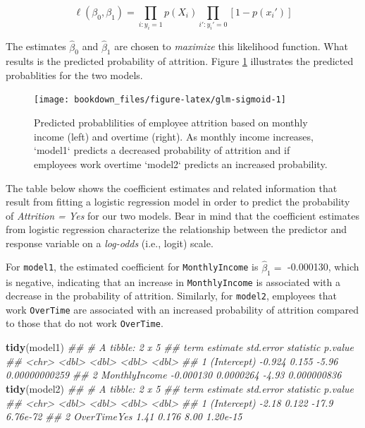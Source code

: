 \documentclass[]{krantz}
\makeatletter
\newenvironment{Shaded}{\begin{snugshade}}{\end{snugshade}}
\newcommand{\CommentTok}[1]{\textcolor[rgb]{0.37,0.37,0.37}{\textit{#1}}}
\newcommand{\KeywordTok}[1]{\textcolor[rgb]{0.27,0.27,0.27}{\textbf{#1}}}
\newcommand{\NormalTok}[1]{#1}
\newenvironment{kframe}{%
\medskip{}
\setlength{\fboxsep}{.8em}
 \def\at@end@of@kframe{}%
 \ifinner\ifhmode%
  \def\at@end@of@kframe{\end{minipage}}%
  \begin{minipage}{\columnwidth}%
 \fi\fi%
 \def\FrameCommand##1{\hskip\@totalleftmargin \hskip-\fboxsep
 \colorbox{shadecolor}{##1}\hskip-\fboxsep
     \hskip-\linewidth \hskip-\@totalleftmargin \hskip\columnwidth}%
 \MakeFramed {\advance\hsize-\width
   \@totalleftmargin\z@ \linewidth\hsize
   \@setminipage}}%
 {\par\unskip\endMakeFramed%
 \at@end@of@kframe}
\renewenvironment{Shaded}{\begin{kframe}}{\end{kframe}}
\makeatother
\begin{document}
\begin{equation}
\label{eq:max-like} 
  \ell\left(\beta_0, \beta_1\right) = \prod_{i:y_i=1}p\left(X_i\right) \prod_{i':y_i'=0}\left[1-p\left(x_i'\right)\right]
\end{equation}

The estimates \(\widehat \beta_0\) and \(\widehat \beta_1\) are chosen to \emph{maximize} this likelihood function. What results is the predicted probability of attrition. Figure \ref{fig:glm-sigmoid} illustrates the predicted probablities for the two models.

\begin{figure}

{\centering \texttt{[image: bookdown\_files/figure-latex/glm-sigmoid-1]} 

}

\caption{Predicted probablilities of employee attrition based on monthly income (left) and overtime (right). As monthly income increases, `model1` predicts a decreased probability of attrition and if employees work overtime `model2` predicts an increased probability.}\label{fig:glm-sigmoid}
\end{figure}

The table below shows the coefficient estimates and related information that result from fitting a logistic regression model in order to predict the probability of \emph{Attrition = Yes} for our two models. Bear in mind that the coefficient estimates from logistic regression characterize the relationship between the predictor and response variable on a \emph{log-odds} (i.e., logit) scale.

For \texttt{model1}, the estimated coefficient for \texttt{MonthlyIncome} is \(\widehat \beta_1 =\) -0.000130, which is negative, indicating that an increase in \texttt{MonthlyIncome} is associated with a decrease in the probability of attrition. Similarly, for \texttt{model2}, employees that work \texttt{OverTime} are associated with an increased probability of attrition compared to those that do not work \texttt{OverTime}.

\begin{Shaded}
\begin{Highlighting}[]
\KeywordTok{tidy}\NormalTok{(model1)}
\CommentTok{## # A tibble: 2 x 5}
\CommentTok{##   term           estimate std.error statistic       p.value}
\CommentTok{##   <chr>             <dbl>     <dbl>     <dbl>         <dbl>}
\CommentTok{## 1 (Intercept)   -0.924    0.155         -5.96 0.00000000259}
\CommentTok{## 2 MonthlyIncome -0.000130 0.0000264     -4.93 0.000000836}
\KeywordTok{tidy}\NormalTok{(model2)}
\CommentTok{## # A tibble: 2 x 5}
\CommentTok{##   term        estimate std.error statistic  p.value}
\CommentTok{##   <chr>          <dbl>     <dbl>     <dbl>    <dbl>}
\CommentTok{## 1 (Intercept)    -2.18     0.122    -17.9  6.76e-72}
\CommentTok{## 2 OverTimeYes     1.41     0.176      8.00 1.20e-15}
\end{Highlighting}
\end{Shaded}
\end{document}
